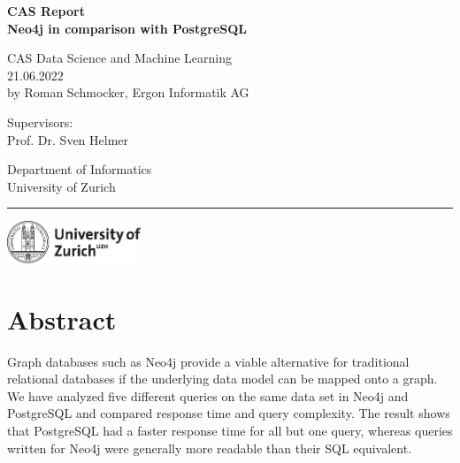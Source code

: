 \documentclass[11pt, a4paper,oneside,chapterprefix=false]{scrbook}
\begin{document}
\frontmatter
\begin{titlepage}
	\setlength{\parindent}{0cm}
	\addtolength{\textheight}{1.0cm}
	\vspace{0.5cm}
	\sffamily\Huge
	{\textbf {CAS Report \\ Neo4j in comparison with PostgreSQL}}

	\vfill \vfill \vfill

	\vfill
	\textsf\Large
	CAS Data Science and Machine Learning \\[0.5cm]\large
	21.06.2022\\[0.5cm]
	\large
	by Roman Schmocker, Ergon Informatik AG

	\vfill \vfill \vfill
	\begin{minipage}[b]{0.5\textwidth}
	Supervisors: \\
	Prof. Dr. Sven Helmer
	\end{minipage}
	\begin{minipage}[b]{0.5\textwidth} \raggedleft
	Department of Informatics \\
	University of Zurich
	\end{minipage}

	\vfill
	\hrule
	\vspace{0.5cm}
	\includegraphics*[width=0.3\textwidth]{figures/uzh_logo} \hfill
\end{titlepage}


\chapter{Abstract} \label{chp:abstract}

Graph databases such as Neo4j provide a viable alternative for traditional relational databases if the underlying data model can be mapped onto a graph. 
We have analyzed five different queries on the same data set in Neo4j and PostgreSQL and compared response time and query complexity. 
The result shows that PostgreSQL had a faster response time for all but one query, whereas queries written for Neo4j were generally more readable than their SQL equivalent.
\end{document}
